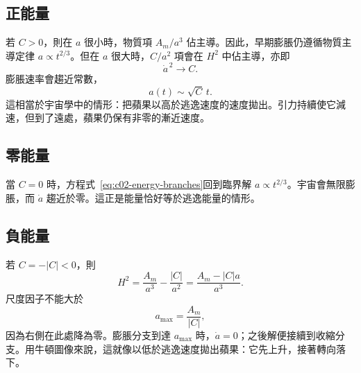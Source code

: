 \subsection{正能量}

若 \(C>0\)，則在 \(a\) 很小時，物質項 \(A_m/a^3\) 佔主導。因此，早期膨脹仍遵循物質主導定律 \(a\propto t^{2/3}\)。但在 \(a\) 很大時，\(C/a^2\) 項會在 \(H^2\) 中佔主導，亦即
\begin{equation}
\dot a^{\,2}\longrightarrow C.
\end{equation}
膨脹速率會趨近常數，
\begin{equation}
a(t)\sim\sqrt C\,t.
\label{eq:c02-positive-late}
\end{equation}
這相當於宇宙學中的情形：把蘋果以高於逃逸速度的速度拋出。引力持續使它減速，但到了遠處，蘋果仍保有非零的漸近速度。

\subsection{零能量}

當 \(C=0\) 時，方程式~\eqref{eq:c02-energy-branches}回到臨界解 \(a\propto t^{2/3}\)。宇宙會無限膨脹，而 \(\dot a\) 趨近於零。這正是能量恰好等於逃逸能量的情形。

\subsection{負能量}

若 \(C=-|C|<0\)，則
\begin{equation}
H^2=\frac{A_m}{a^3}-\frac{|C|}{a^2}
=\frac{A_m-|C|a}{a^3}.
\label{eq:c02-negative-energy}
\end{equation}
尺度因子不能大於
\begin{equation}
a_{\max}=\frac{A_m}{|C|},
\label{eq:c02-amax}
\end{equation}
因為右側在此處降為零。膨脹分支到達 \(a_{\max}\) 時，\(\dot a=0\)；之後解便接續到收縮分支。用牛頓圖像來說，這就像以低於逃逸速度拋出蘋果：它先上升，接著轉向落下。

\begin{classroomqa}
\end{classroomqa}

